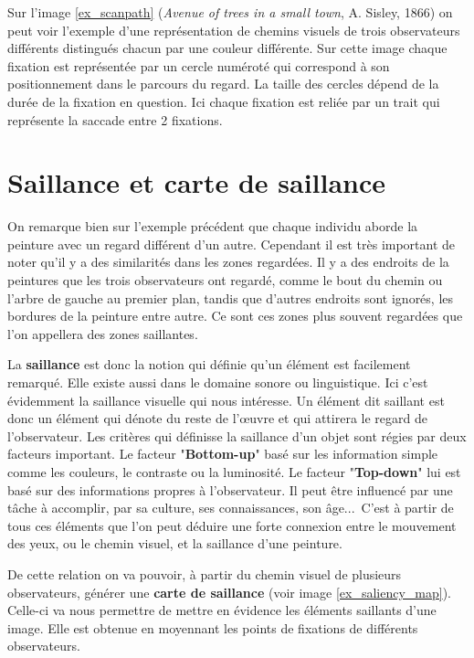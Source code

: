 \par
Sur l'image \ref{ex_scanpath} (\emph{Avenue of trees in a small town}, A. Sisley, 1866) on peut voir l'exemple d'une représentation de chemins visuels de trois observateurs différents distingués chacun par une couleur différente. Sur cette image chaque fixation est représentée par un cercle numéroté qui correspond à son positionnement dans le parcours du regard. La taille des cercles dépend de la durée de la fixation en question. Ici chaque fixation est reliée par un trait qui représente la saccade entre 2 fixations.

\section{Saillance et carte de saillance}
\par
On remarque bien sur l'exemple précédent que chaque individu aborde la peinture avec un regard différent d'un autre. Cependant il est très important de noter qu'il y a des similarités dans les zones regardées. Il y a des endroits de la peintures que les trois observateurs ont regardé, comme le bout du chemin ou l'arbre de gauche au premier plan, tandis que d'autres endroits sont ignorés, les bordures de la peinture entre autre. Ce sont ces zones plus souvent regardées que l'on appellera des zones saillantes.

\par
La \textbf{saillance} est donc la notion qui définie qu'un élément est facilement remarqué. Elle existe aussi dans le domaine sonore ou linguistique. Ici c'est évidemment la saillance visuelle qui nous intéresse. Un élément dit saillant est donc un élément qui dénote du reste de l'\oe{}uvre et qui attirera le regard de l'observateur. Les critères qui définisse la saillance d'un objet sont régies par deux facteurs important. Le facteur "\textbf{Bottom-up}" basé sur les information simple comme les couleurs, le contraste ou la luminosité. Le facteur "\textbf{Top-down}" lui est basé sur des informations propres à l'observateur. Il peut être influencé par une tâche à accomplir, par sa culture, ses connaissances, son âge...\ C'est à partir de tous ces éléments que l'on peut déduire une forte connexion entre le mouvement des yeux, ou le chemin visuel, et la saillance d'une peinture.

\par
De cette relation on va pouvoir, à partir du chemin visuel de plusieurs observateurs, générer une \textbf{carte de saillance} (voir image \ref{ex_saliency_map}). Celle-ci va nous permettre de mettre en évidence les éléments saillants d'une image. Elle est obtenue en moyennant les points de fixations de différents observateurs. 

